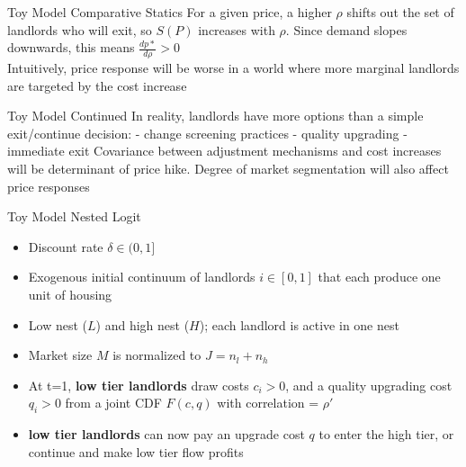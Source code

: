 \documentclass[10pt, xcolor=dvipsnames]{beamer}
\begin{document}
\begin{frame}{Toy Model Comparative Statics}
For a given price, a higher $\rho$ shifts out the set of landlords who will exit, so $S(P)$ increases with $\rho$. Since demand slopes downwards, this means $\frac{dp*}{d\rho} >0$\\

Intuitively, price response will be worse in a world where more marginal landlords are targeted by the cost increase
    
\end{frame}

\begin{frame}{Toy Model Continued}
    In reality, landlords have more options than a simple exit/continue decision:
    - change screening practices
    - quality upgrading
    - immediate exit
    Covariance between adjustment mechanisms and cost increases will be determinant of price hike. Degree of market segmentation will also affect price responses
\end{frame}

\begin{frame}{Toy Model Nested Logit}
    \begin{itemize}
        \item Discount rate $\delta \in (0,1]$
        \item Exogenous initial continuum of landlords $i \in [0,1]$ that each produce one unit of housing
        \item Low nest ($L$) and high nest ($H$); each landlord is active in one nest
        \item Market size $M$ is normalized to $J=n_l +n_h$
        \item At t=1, \textbf{low tier landlords} draw costs $c_i>0$, and a quality upgrading cost $q_i>0$ from a joint CDF $F(c,q)$ with correlation = $\rho'$
        \item \textbf{low tier landlords} can now pay an upgrade cost $q$ to enter the high tier, or continue and make low tier flow profits
    \end{itemize}    
\end{frame}
\end{document}
